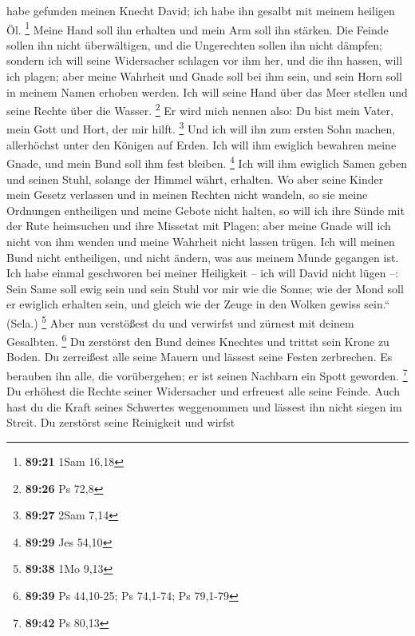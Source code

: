 habe gefunden meinen Knecht David; ich habe ihn gesalbt mit meinem
heiligen Öl. \footnote{\textbf{89:21} 1Sam 16,18}  Meine
Hand soll ihn erhalten und mein Arm soll ihn stärken.  Die
Feinde sollen ihn nicht überwältigen, und die Ungerechten sollen ihn
nicht dämpfen;  sondern ich will seine Widersacher schlagen
vor ihm her, und die ihn hassen, will ich plagen;  aber
meine Wahrheit und Gnade soll bei ihm sein, und sein Horn soll in meinem
Namen erhoben werden.  Ich will seine Hand über das Meer
stellen und seine Rechte über die Wasser. \footnote{\textbf{89:26} Ps
  72,8}  Er wird mich nennen also: Du bist mein Vater, mein
Gott und Hort, der mir hilft. \footnote{\textbf{89:27} 2Sam 7,14}
 Und ich will ihn zum ersten Sohn machen, allerhöchst unter
den Königen auf Erden.  Ich will ihm ewiglich bewahren
meine Gnade, und mein Bund soll ihm fest bleiben. \footnote{\textbf{89:29}
  Jes 54,10}  Ich will ihm ewiglich Samen geben und seinen
Stuhl, solange der Himmel währt, erhalten.  Wo aber seine
Kinder mein Gesetz verlassen und in meinen Rechten nicht wandeln,
 so sie meine Ordnungen entheiligen und meine Gebote nicht
halten,  so will ich ihre Sünde mit der Rute heimsuchen und
ihre Missetat mit Plagen;  aber meine Gnade will ich nicht
von ihm wenden und meine Wahrheit nicht lassen trügen.  Ich
will meinen Bund nicht entheiligen, und nicht ändern, was aus meinem
Munde gegangen ist.  Ich habe einmal geschworen bei meiner
Heiligkeit -- ich will David nicht lügen --:  Sein Same
soll ewig sein und sein Stuhl vor mir wie die Sonne;  wie
der Mond soll er ewiglich erhalten sein, und gleich wie der Zeuge in den
Wolken gewiss sein.`` (Sela.) \footnote{\textbf{89:38} 1Mo 9,13}
 Aber nun verstößest du und verwirfst und zürnest mit
deinem Gesalbten. \footnote{\textbf{89:39} Ps 44,10-25; Ps 74,1-74; Ps
  79,1-79}  Du zerstörst den Bund deines Knechtes und
trittst sein Krone zu Boden.  Du zerreißest alle seine
Mauern und lässest seine Festen zerbrechen.  Es berauben
ihn alle, die vorübergehen; er ist seinen Nachbarn ein Spott geworden.
\footnote{\textbf{89:42} Ps 80,13}  Du erhöhest die Rechte
seiner Widersacher und erfreuest alle seine Feinde.  Auch
hast du die Kraft seines Schwertes weggenommen und lässest ihn nicht
siegen im Streit.  Du zerstörst seine Reinigkeit und wirfst
